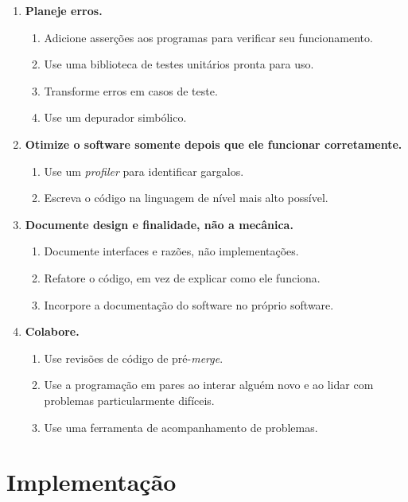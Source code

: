 \begin{tcolorbox}
\begin{enumerate}
\item \textbf{Planeje erros.}
    \begin{enumerate}
        \item Adicione asserções aos programas para verificar seu funcionamento.
        \item Use uma biblioteca de testes unitários pronta para uso.
        \item Transforme erros em casos de teste.
        \item Use um depurador simbólico.
    \end{enumerate}

\item \textbf{Otimize o software somente depois que ele funcionar corretamente.}
    \begin{enumerate}
        \item Use um \textit{profiler} para identificar gargalos.
        \item Escreva o código na linguagem de nível mais alto possível.
    \end{enumerate}

\item \textbf{Documente design e finalidade, não a mecânica.}
    \begin{enumerate}
        \item Documente interfaces e razões, não implementações.
        \item Refatore o código, em vez de explicar como ele funciona.
        \item Incorpore a documentação do software no próprio software.
    \end{enumerate}

\item \textbf{Colabore.}
    \begin{enumerate}
        \item Use revisões de código de pré-\textit{merge}.
        \item Use a programação em pares ao interar alguém novo e ao lidar com problemas particularmente difíceis.
        \item Use uma ferramenta de acompanhamento de problemas.
    \end{enumerate}
\end{enumerate}
\end{tcolorbox}


\section{Implementação}


